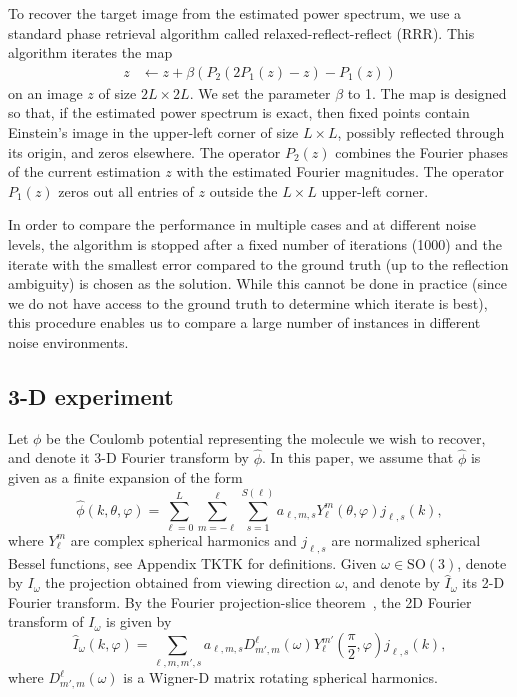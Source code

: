 \documentclass[english,11pt]{article}
\newcommand{\1}{\mathbf{1}}
\newcommand{\TODO}[1]{{\color{red}{[#1]}}}
\numberwithin{equation}{section}
\theoremstyle{plain}
\theoremstyle{definition}
\theoremstyle{remark}
\theoremstyle{plain}
\theoremstyle{remark}
\theoremstyle{plain}
\theoremstyle{plain}
\newcommand{\be}{\begin{equation}}
\newcommand{\ee}{\end{equation}}
\begin{document}
To recover the target image from the estimated power spectrum, we use a standard phase retrieval algorithm called relaxed-reflect-reflect (RRR). This algorithm iterates the map
\begin{align*}
	z & \leftarrow z + \beta (P_2(2P_1(z) - z) - P_1(z))
\end{align*}
on an image $z$ of size $2L\times 2L$.
We set the parameter $\beta$ to 1.
The map is designed so that, if the estimated power spectrum is exact, then fixed points contain Einstein's image in the upper-left corner of size $L \times L$, possibly reflected through its origin, and zeros elsewhere. The operator $P_2(z)$ combines the Fourier phases of  the current estimation $z$ with the estimated Fourier magnitudes. The operator $P_1(z)$ zeros out all entries of $z$ outside the $L\times L$ upper-left corner. 

In order to compare the performance in multiple cases and at different noise levels, the algorithm is stopped after a fixed number of iterations (1000) and the iterate with the smallest error compared to the ground truth (up to the reflection ambiguity) is chosen as the solution. While this cannot be done in practice (since we do not have access to the ground truth to determine which iterate is best), this procedure enables us to compare a large number of instances in different noise environments. \TODO{Note the last two sentences!}


\subsection{3-D experiment}
\TODO{Add similarities to 2-D}

\TODO{Proposal: Use W for size of projection, M for size of micrograph}

Let $\phi$ be the Coulomb potential representing the molecule we wish to recover, and denote it 3-D Fourier transform by $\widehat \phi$. In this paper, we assume that $\widehat\phi$ is given as a finite expansion of the form
\be\label{eq:volume_expansion} 
\widehat \phi(k, \theta, \varphi) = \sum_{\ell = 0}^L\sum_{m=-\ell}^{\ell}\sum_{s=1}^{S(\ell)}a_{\ell, m, s}Y_{\ell}^m(\theta,\varphi)j_{\ell,s}(k),
\ee
where $Y_{\ell}^m$ are complex spherical harmonics and $j_{\ell,s}$ are normalized spherical Bessel functions, see Appendix TKTK for definitions. \TODO{Mention somewhere that since $\phi$ is real-valued, we recover only coefficients with $m\geq 0$.} Given $\omega\in\text{SO}(3)$, denote by $I_{\omega}$ the projection obtained from viewing direction $\omega$, and denote by $\widehat I_{\omega}$ its 2-D Fourier transform. By the Fourier projection-slice theorem~\cite[p. 11]{natterer1986mathematics}, the 2D Fourier transform of $I_{\omega}$ is given by \TODO{Move to appendix?}
\be\label{eq:projection_model}
\widehat I_{\omega}(k,\varphi) = \sum_{\ell,m,m',s}a_{\ell,m,s}D_{m',m}^{\ell}(\omega)Y_{\ell}^{m'}\left(\frac{\pi}{2},\varphi\right)j_{\ell,s}(k),\ee
where $D_{m',m}^{\ell}(\omega)$ is a Wigner-D matrix rotating spherical harmonics. 
\end{document}
